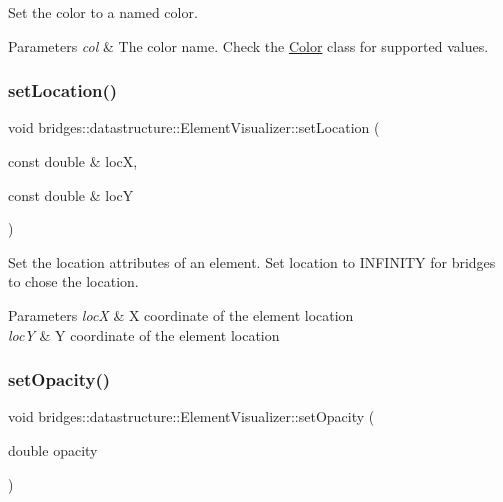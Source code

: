 Set the color to a named color. 


\begin{DoxyParams}{Parameters}
{\em col} & The color name. Check the \hyperlink{classbridges_1_1datastructure_1_1_color}{Color} class for supported values. \\
\hline
\end{DoxyParams}
\mbox{\label{classbridges_1_1datastructure_1_1_element_visualizer_ae980cb185ddb11ecd1cebeb4834734bf}} 
\subsubsection{\texorpdfstring{set\+Location()}{setLocation()}}
{\footnotesize\ttfamily void bridges\+::datastructure\+::\+Element\+Visualizer\+::set\+Location (\begin{DoxyParamCaption}\item[{const double \&}]{locX,  }\item[{const double \&}]{locY }\end{DoxyParamCaption})\hspace{0.3cm}{\ttfamily [inline]}}

Set the location attributes of an element. Set location to I\+N\+F\+I\+N\+I\+TY for bridges to chose the location.


\begin{DoxyParams}{Parameters}
{\em locX} & X coordinate of the element location \\
\hline
{\em locY} & Y coordinate of the element location \\
\hline
\end{DoxyParams}
\mbox{\label{classbridges_1_1datastructure_1_1_element_visualizer_a03f0ba203affb77d4ba8d2f1a6b1eea0}} 
\subsubsection{\texorpdfstring{set\+Opacity()}{setOpacity()}}
{\footnotesize\ttfamily void bridges\+::datastructure\+::\+Element\+Visualizer\+::set\+Opacity (\begin{DoxyParamCaption}\item[{double}]{opacity }\end{DoxyParamCaption})\hspace{0.3cm}{\ttfamily [inline]}}

